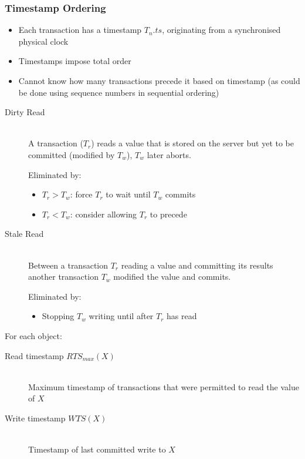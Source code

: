 \documentclass[a4paper]{article}
\begin{document}
\subsubsection{Timestamp Ordering}

\begin{itemize}
  \item Each transaction has a timestamp $T_{n}.ts$, originating from a
        synchronised physical clock
  \item Timestamps impose total order
  \item Cannot know how many transactions precede it based on timestamp (as
        could be done using sequence numbers in sequential ordering)
\end{itemize}


\begin{description}
  \item[Dirty Read] \hfill \\
    A transaction ($T_{r}$) reads a value that is stored on the server but yet
    to be committed (modified by $T_{w}$), $T_{w}$ later aborts.

    Eliminated by:

    \begin{itemize}
      \item $T_{r} > T_{w}$: force $T_{r}$ to wait until $T_{w}$ commits
      \item $T_{r} < T_{w}$: consider allowing $T_{r}$ to precede
    \end{itemize}

  \item[Stale Read] \hfill \\
    Between a transaction $T_{r}$ reading a value and committing its results
    another transaction $T_{w}$ modified the value and commits.

    Eliminated by:

    \begin{itemize}
      \item Stopping $T_{w}$ writing until after $T_{r}$ has read
    \end{itemize}

\end{description}


For each object:

\begin{description}
  \item[Read timestamp $RTS_{max}(X)$] \hfill \\
    Maximum timestamp of transactions that were permitted to read the value of
    $X$
  \item[Write timestamp $WTS(X)$] \hfill \\
    Timestamp of last committed write to $X$
\end{description}
\end{document}
